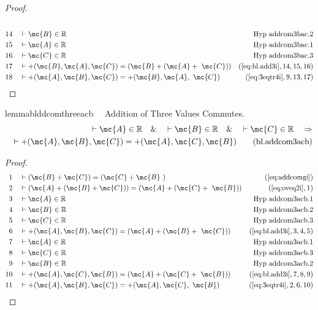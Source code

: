 \begin{proof}
\begin{align}
  \\ 14 &&  & \vdash \mc{B} \in
\mathbb{R}&\text{Hyp~addcom3bac.2}\notag%
  \\ 15 &&  & \vdash \mc{A} \in
\mathbb{R}&\text{Hyp~addcom3bac.1}\notag%
  \\ 16 &&  & \vdash \mc{C} \in
\mathbb{R}&\text{Hyp~addcom3bac.3}\notag%
  \\ 17 &&  & \vdash +( \mc{B} , \mc{A} , \mc{C} ) = ( \mc{B} + ( \mc{A} +
     ~\mc{C} ) )&(\mbox{\ref{eq:bl.add3i}},14,15,16)\notag
  \\ 18 &&  & \vdash +( \mc{A} , \mc{B} , \mc{C} ) = +( \mc{B} , \mc{A} ,
     ~\mc{C} )&(\mbox{\ref{eq:3eqtr4i}},9,13,17)\notag
\end{align}
\end{proof}

\begin{restatable}{lemma}{blddcomthreeacb}~~ Addition of Three Values Commutes.
\begin{align}
\vdash \mc{A} \in \mathbb{R}\quad\&\quad \vdash \mc{B} \in
    \mathbb{R}\quad\&\quad \vdash \mc{C} \in \mathbb{R}\quad\Rightarrow \notag \\ 
	\quad
    \vdash +( \mc{A} , \mc{B} , \mc{C} ) = +( \mc{A} , \mc{C} , \mc{B}
    )\label{eq:bl.addcom3acb}\tag{bl.addcom3acb}
\end{align}
\end{restatable}

\begin{proof}
\begin{align}
  1 &&  & \vdash ( \mc{B} + \mc{C} ) = ( \mc{C} + \mc{B}
     ~)&(\mbox{\ref{eq:addcomgi}})\notag
  \\ 2 &&  & \vdash ( \mc{A} + ( \mc{B} + \mc{C} ) ) = ( \mc{A} + ( \mc{C} +
     ~\mc{B} ) )&(\mbox{\ref{eq:oveq2i}},1)\notag
  \\ 3 &&  & \vdash \mc{A} \in
\mathbb{R}&\text{Hyp~addcom3acb.1}\notag%
  \\ 4 &&  & \vdash \mc{B} \in
\mathbb{R}&\text{Hyp~addcom3acb.2}\notag%
  \\ 5 &&  & \vdash \mc{C} \in
\mathbb{R}&\text{Hyp~addcom3acb.3}\notag%
  \\ 6 &&  & \vdash +( \mc{A} , \mc{B} , \mc{C} ) = ( \mc{A} + ( \mc{B} +
     ~\mc{C} ) )&(\mbox{\ref{eq:bl.add3i}},3,4,5)\notag
  \\ 7 &&  & \vdash \mc{A} \in
\mathbb{R}&\text{Hyp~addcom3acb.1}\notag%
  \\ 8 &&  & \vdash \mc{C} \in
\mathbb{R}&\text{Hyp~addcom3acb.3}\notag%
  \\ 9 &&  & \vdash \mc{B} \in
\mathbb{R}&\text{Hyp~addcom3acb.2}\notag%
  \\ 10 &&  & \vdash +( \mc{A} , \mc{C} , \mc{B} ) = ( \mc{A} + ( \mc{C} +
     ~\mc{B} ) )&(\mbox{\ref{eq:bl.add3i}},7,8,9)\notag
  \\ 11 &&  & \vdash +( \mc{A} , \mc{B} , \mc{C} ) = +( \mc{A} , \mc{C} ,
     ~\mc{B} )&(\mbox{\ref{eq:3eqtr4i}},2,6,10)\notag
\end{align}
\end{proof}


